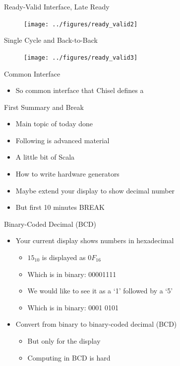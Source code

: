 \begin{frame}[fragile]{Ready-Valid Interface, Late Ready}
\begin{figure}
  \texttt{[image: ../figures/ready\_valid2]}
\end{figure}
\end{frame}

\begin{frame}[fragile]{Single Cycle and Back-to-Back}
\begin{figure}
  \texttt{[image: ../figures/ready\_valid3]}
\end{figure}
\end{frame}

\begin{frame}[fragile]{Common Interface}
\begin{itemize}
\item So common interface that Chisel defines a 
\end{itemize}
\end{frame}

\begin{frame}[fragile]{First Summary and Break}
\begin{itemize}
\item Main topic of today done
\item Following is advanced material
\item A little bit of Scala
\item How to write hardware generators
\item Maybe extend your display to show decimal number
\item But first 10 minutes BREAK
\end{itemize}
\end{frame}


\begin{frame}[fragile]{Binary-Coded Decimal (BCD)}
\begin{itemize}
\item Your current display shows numbers in hexadecimal 
\begin{itemize}
\item $15_{10}$ is displayed as $0F_{16}$
\item Which is in binary: 00001111
\item We would like to see it as a `1' followed by a `5'
\item Which is in binary: 0001 0101
\end{itemize}
\item Convert from binary to binary-coded decimal (BCD)
\begin{itemize}
\item But only for the display
\item Computing in BCD is hard
\end{itemize}
\end{itemize}
\end{frame}

